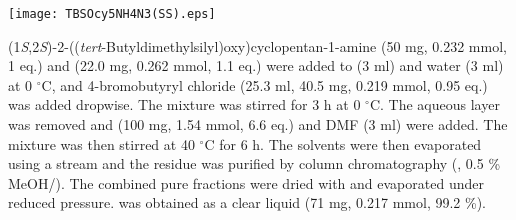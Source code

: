 
\begin{scheme}[H]
	\begin{center}
		\texttt{[image: TBSOcy5NH4N3(SS).eps]}
	\end{center}
\end{scheme}
(1\textit{S},2\textit{S})\hyp{}2\hyp{}((\textit{tert}\hyp{}Butyldimethylsilyl)oxy)cyclopentan\hyp{}1\hyp{}amine  (50 mg, 0.232 mmol, 1 eq.) and  (22.0 mg, 0.262 mmol, 1.1 eq.) were added to  (3 ml) and water (3 ml) at 0 $^\circ$C, and 4-bromobutyryl chloride (25.3 ml, 40.5 mg, 0.219 mmol, 0.95 eq.) was added dropwise. The mixture was stirred for 3 h at 0 $^\circ$C. The aqueous layer was removed and  (100 mg, 1.54 mmol, 6.6 eq.) and DMF (3 ml) were added. The mixture was then stirred at 40 $^\circ$C for 6 h. The solvents were then evaporated using a  stream and the residue was purified by column chromatography (, 0.5 \% MeOH/). The combined pure fractions were dried with  and evaporated under reduced pressure.  was obtained as a clear liquid (71 mg, 0.217 mmol, 99.2 \%).
\\[1\baselineskip]
\\[1\baselineskip]
\\[1\baselineskip]
